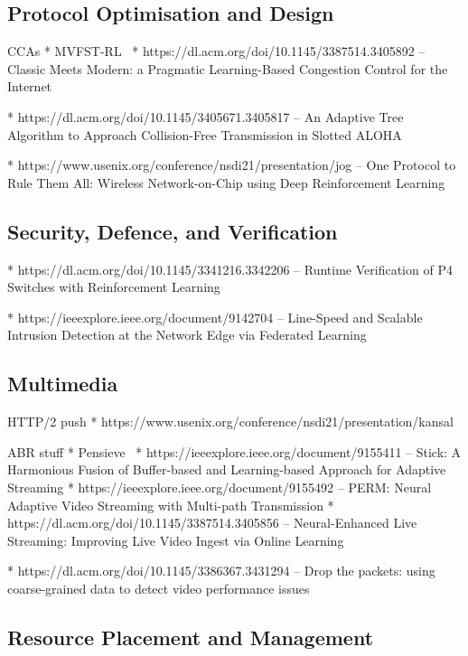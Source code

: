 \subsection{Protocol Optimisation and Design}

CCAs
* MVFST-RL~\parencite{DBLP:journals/corr/abs-1910-04054}
* https://dl.acm.org/doi/10.1145/3387514.3405892 -- Classic Meets Modern: a Pragmatic Learning-Based Congestion Control for the Internet

* https://dl.acm.org/doi/10.1145/3405671.3405817 -- An Adaptive Tree Algorithm to Approach Collision-Free Transmission in Slotted ALOHA

* https://www.usenix.org/conference/nsdi21/presentation/jog -- One Protocol to Rule Them All: Wireless Network-on-Chip using Deep Reinforcement Learning

\subsection{Security, Defence, and Verification}

* https://dl.acm.org/doi/10.1145/3341216.3342206 -- Runtime Verification of P4 Switches with Reinforcement Learning

* https://ieeexplore.ieee.org/document/9142704 -- Line-Speed and Scalable Intrusion Detection at the Network Edge via Federated Learning

\subsection{Multimedia}

HTTP/2 push
* https://www.usenix.org/conference/nsdi21/presentation/kansal

ABR stuff
* Pensieve~\parencite{DBLP:conf/sigcomm/MaoNA17}
* https://ieeexplore.ieee.org/document/9155411 -- Stick: A Harmonious Fusion of Buffer-based and Learning-based Approach for Adaptive Streaming
* https://ieeexplore.ieee.org/document/9155492 -- PERM: Neural Adaptive Video Streaming with Multi-path Transmission
* https://dl.acm.org/doi/10.1145/3387514.3405856 -- Neural-Enhanced Live Streaming: Improving Live Video Ingest via Online Learning

* https://dl.acm.org/doi/10.1145/3386367.3431294 -- Drop the packets: using coarse-grained data to detect video performance issues

\subsection{Resource Placement and Management}

